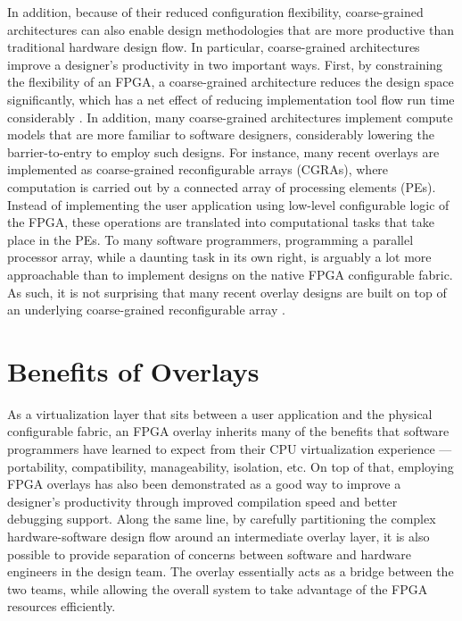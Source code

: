
In addition, because of their reduced configuration flexibility, coarse-grained architectures can also enable design methodologies that are more productive than traditional hardware design flow.
In particular, coarse-grained architectures improve a designer's productivity in two important ways.
First, by constraining the flexibility of an FPGA, a coarse-grained architecture reduces the design space significantly, which has a net effect of reducing implementation tool flow run time considerably \cite{lavin2011}. 
In addition, many coarse-grained architectures implement compute models that are more familiar to software designers, considerably lowering the barrier-to-entry to employ such designs.  For instance, many recent overlays are implemented as coarse-grained reconfigurable arrays (CGRAs), where computation is carried out by a connected array of processing elements (PEs).
Instead of implementing the user application using low-level configurable logic of the FPGA, these operations are translated into computational tasks that take place in the PEs.
To many software programmers, programming a parallel processor array, while a daunting task in its own right, is arguably a lot more approachable than to implement designs on the native FPGA configurable fabric.
As such, it is not surprising that many recent overlay designs are built on top of an underlying coarse-grained reconfigurable array \cite{kissler2006dynamically,ferreira2011fpga,shukla2006quku,Lin:2012:EDC:2460216.2460227,capalijia2013pipelined,dspoverlay}.





\section{Benefits of Overlays}
As a virtualization layer that sits between a user application and the physical configurable fabric, an FPGA overlay inherits many of the benefits that software programmers have learned to expect from their CPU virtualization experience --- portability, compatibility, manageability, isolation, etc.  On top of that, employing FPGA overlays has also been demonstrated as a good way to improve a designer's productivity through improved compilation speed and better debugging support.  Along the same line, by carefully partitioning the complex hardware-software design flow around an intermediate overlay layer, it is also possible to provide separation of concerns between software and hardware engineers in the design team.
The overlay essentially acts as a bridge between the two teams, while allowing the overall system to take advantage of the FPGA resources efficiently.

